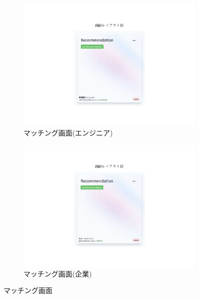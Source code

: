 \documentclass[10pt]{ltjsarticle}
\begin{document}
\begin{figure}[H]
    \centering
    \begin{subfigure}{0.49\textwidth}
        \centering
        \includegraphics[trim=9cm 3.4cm 9cm 4.6cm, clip, width=\linewidth]{./img/recommend_engineer1.pdf}
        \caption{マッチング画面(エンジニア)}
        \label{fig:recommend_engineer1}
    \end{subfigure}
    \hfill
    \begin{subfigure}{0.49\textwidth}
        \centering
        \includegraphics[trim=9cm 3.4cm 9cm 4.6cm, clip, width=\linewidth]{./img/recommend_company1.pdf}
        \caption{マッチング画面(企業)}
        \label{fig:recommend_company1}
    \end{subfigure}
    \caption{マッチング画面}
    \label{fig:recommend1}
\end{figure}
\vspace{-.5cm}
\end{document}
